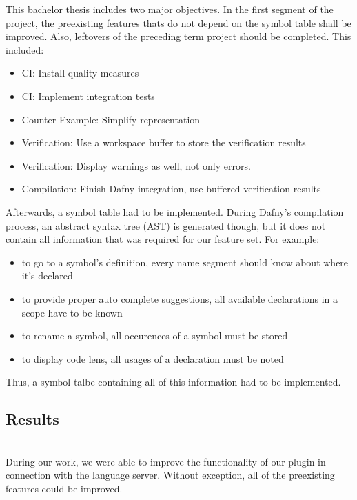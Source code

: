 This bachelor thesis includes two major objectives. In the first segment of the project, the preexisting features thats do not depend on the symbol table shall be improved. Also, leftovers of the preceding term project should be completed. This included:
\begin{itemize}
    \item CI: Install quality measures
    \item CI: Implement integration tests
    \item Counter Example: Simplify representation
    \item Verification: Use a workspace buffer to store the verification results
    \item Verification: Display warnings as well, not only errors.
    \item Compilation: Finish Dafny integration, use buffered verification results
\end{itemize}
Afterwards, a symbol table had to be implemented. During Dafny's compilation process, an abstract syntax tree (AST) is generated though, but it does not contain all information that was required for our feature set. For example:
\begin{itemize}
    \item to go to a symbol's definition, every name segment should know about where it's declared
    \item to provide proper auto complete suggestions, all available declarations in a scope have to be known
    \item to rename a symbol, all occurences of a symbol must be stored
    \item to display code lens, all usages of a declaration must be noted
\end{itemize}
Thus, a symbol talbe containing all of this information had to be implemented.

\subsection{Results}
\\

During our work, we were able to improve the functionality of our plugin in connection with the language server.
Without exception, all of the preexisting features could be improved.\\

